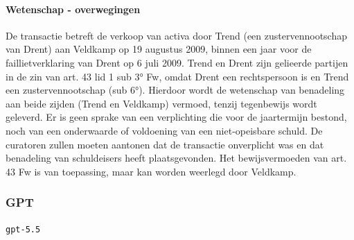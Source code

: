 \documentclass[
  dutch,
  a4paper,
]{article}
\begin{document}
\paragraph{Wetenschap - overwegingen}\label{wetenschap---overwegingen-69}

De transactie betreft de verkoop van activa door Trend (een zustervennootschap van Drent) aan Veldkamp op 19 augustus 2009, binnen een jaar voor de faillietverklaring van Drent op 6 juli 2009. Trend en Drent zijn gelieerde partijen in de zin van art. 43 lid 1 sub 3° Fw, omdat Drent een rechtspersoon is en Trend een zustervennootschap (sub 6°). Hierdoor wordt de wetenschap van benadeling aan beide zijden (Trend en Veldkamp) vermoed, tenzij tegenbewijs wordt geleverd. Er is geen sprake van een verplichting die voor de jaartermijn bestond, noch van een onderwaarde of voldoening van een niet-opeisbare schuld. De curatoren zullen moeten aantonen dat de transactie onverplicht was en dat benadeling van schuldeisers heeft plaatsgevonden. Het bewijsvermoeden van art. 43 Fw is van toepassing, maar kan worden weerlegd door Veldkamp.

\newpage


\subsubsection{GPT}\label{gpt-23}

\texttt{gpt-5.5}
\end{document}

